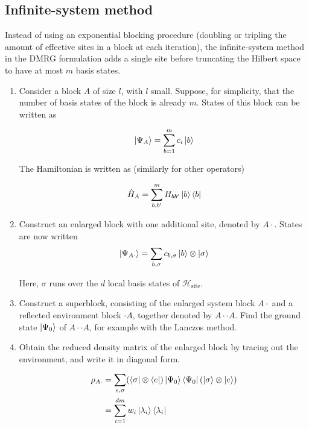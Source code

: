 \subsection{Infinite-system method}

 
Instead of using an exponential blocking procedure (doubling or tripling the
amount of effective sites in a block at each iteration), the infinite-system
method in the DMRG formulation adds a single site before truncating the Hilbert
space to have at most $m$ basis states.

\begin{enumerate}
  \item \label{step1} Consider a block $A$ of size $l$, with $l$ small. Suppose, for
  simplicity, that the number of basis states of the block is already
  $m$. States of this block can be written as

  \begin{equation}
    \ket{\Psi_A} = \sum_{b = 1}^{m} c_{i} \ket{b}
  \end{equation}

  The Hamiltonian is written as (similarly for other operators)

  \begin{equation}
    \hat{H}_{A} = \sum_{b, b'}^{m} H_{b b'} \ket{b} \bra{b}
  \end{equation}

  \item Construct an enlarged block with one additional site, denoted by $A
  \cdot$. States are now written
  \begin{equation}
    \ket{\Psi_{A\cdot}} = \sum_{b, \sigma} c_{b, \sigma} \ket{b} \otimes \ket{\sigma}
  \end{equation}

  Here, $\sigma$ runs over the $d$ local basis states of $\mathcal{H}_{\text{site}}$.

  \item Construct a superblock, consisting of the enlarged system block $A
  \cdot$ and a reflected environment block $\cdot A$, together denoted by $A \cdot
  \cdot A$. Find the ground state $\ket{\Psi_0}$ of $A \cdot \cdot A$, for example
  with the Lanczos method.

  \item Obtain the reduced density matrix of the enlarged block by tracing out
  the environment, and write it in diagonal form.

  \begin{equation}
  \begin{aligned}
    \rho_{A \cdot} & = \sum_{e, \sigma} (\bra{\sigma} \otimes \bra{e}) \ket{\Psi_0} \bra{\Psi_0} (\ket{\sigma} \otimes \ket{e}) \\
    & = \sum_{i = 1}^{d m} w_{i} \ket{\lambda_i} \bra{\lambda_i}
  \end{aligned}
  \end{equation}


\end{enumerate}

